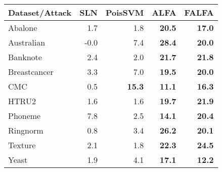 \begin{table}
    \footnotesize
    \centering
    \caption{}
    \begin{tabular}{l|r|r|r|r}
    \toprule
        Dataset/Attack &  SLN &  PoisSVM &  ALFA &  FALFA \\
    \midrule
        Abalone    &   1.7 &      1.8          &  \textbf{20.5} &   \textbf{17.0} \\
        Australian &  -0.0 &      7.4          &  \textbf{28.4} &   \textbf{20.0} \\
          Banknote &   2.4 &      2.0          &  \textbf{21.7} &   \textbf{21.8} \\
      Breastcancer &   3.3 &      7.0          &  \textbf{19.5} &   \textbf{20.0} \\
               CMC &   0.5 &     \textbf{15.3} &  \textbf{11.1} &   \textbf{16.3} \\
             HTRU2 &   1.6 &      1.6          &  \textbf{19.7} &   \textbf{21.9} \\
           Phoneme &   7.8 &      2.5          &  \textbf{14.1} &   \textbf{20.4} \\
          Ringnorm &   0.8 &      3.4          &  \textbf{26.2} &   \textbf{20.1} \\
           Texture &   2.1 &      1.8          &  \textbf{22.3} &   \textbf{24.5} \\
             Yeast &   1.9 &      4.1          &  \textbf{17.1} &   \textbf{12.2} \\
    \bottomrule
    \end{tabular}
    \label{tab.err}
\end{table}


